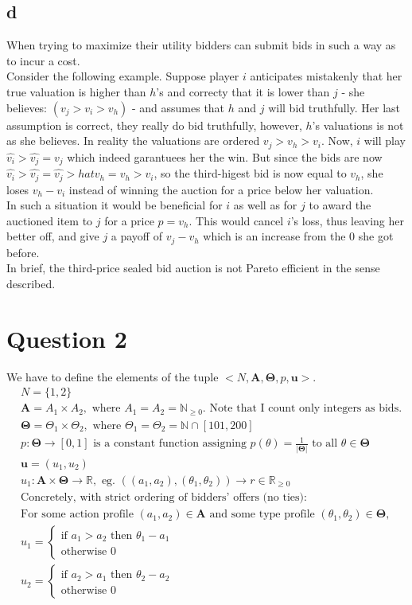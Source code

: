 \documentclass[10pt,a4paper]{article}
\begin{document}
\subsection*{d}
When trying to maximize their utility bidders can submit bids in such a way as to incur a cost. \\
Consider the following example. Suppose player $i$ anticipates mistakenly that her true valuation is higher than $h$'s and correcty that it is lower than $j$ - she believes: $(v_j>v_i>v_h)$ - and assumes that $h$ and $j$ will bid truthfully. Her last assumption is correct, they really do bid truthfully, however, $h$'s valuations is not as she believes. In reality the valuations are ordered $v_j>v_h>v_i$. Now, $i$ will play $\hat{v_{i}}>\hat{v_j}=v_j$ which indeed garantuees her the win. But since the bids are now $\hat{v_i}>\hat{v_j}=\hat{v_j}>hat{v_h}=v_h>v_i$, so the third-higest bid is now equal to $v_h$, she loses $v_h-v_i$ instead of winning the auction for a price below her valuation.\\
In such a situation it would be beneficial for $i$ as well as for $j$ to award the auctioned item to $j$ for a price $p=v_h$. This would cancel $i$'s loss, thus leaving her better off, and give $j$ a payoff of $v_j-v_h$ which is an increase from the $0$ she got before.\\
In brief, the third-price sealed bid auction is not Pareto efficient in the sense described.
\section*{Question 2}
We have to define the elements of the tuple $<N,\bm{A},\bm{\Theta},p,\bm{u}>$.
\begin{align*}
&N=\{1,2\} \\
&\bm{A}=A_1\times A_2, \text{ where $A_1=A_2=\mathbb{N}_{\geq 0}$}\text{. Note that I count only integers as bids.}\\
&\bm{\Theta}=\Theta_1 \times \Theta_2, \text{ where $\Theta_1=\Theta_2= \mathbb{N}\cap [101,200]$}\\
&p: \bm{\Theta} \rightarrow [0,1] \text{ is a constant function assigning $p(\theta)=\tfrac{1}{|\bm{\Theta}|}$ to all $\theta \in \bm{\Theta}$}\\
&\bm{u}=(u_1,u_2)\\
&u_1:\bm{A}\times \bm{\Theta} \rightarrow \mathbb{R},\text{ eg. $((a_1,a_2),(\theta_1, \theta_2))\rightarrow r\in \mathbb{R}_{\geq 0}$}\\
&\text{Concretely, with strict ordering of bidders' offers (no ties):}\\
&\text{For some action profile $(a_1,a_2)\in\bm{A}$ and some type profile $(\theta_1,\theta_2)\in \bm{\Theta}$,}\\
&u_1=\begin{cases}
\text{if } a_1>a_2 \text{ then }\theta_1-a_1 \\
\text{otherwise } 0
\end{cases}\\
&u_2=\begin{cases}
\text{if } a_2>a_1 \text{ then }\theta_2-a_2 \\
\text{otherwise } 0
\end{cases}
\end{align*}
\end{document}
